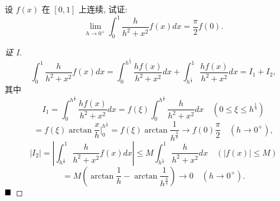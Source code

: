 \documentclass[lang=cn,newtx,10pt,scheme=chinese]{elegantbook}
\begin{document}
\begin{example}\label{eg:4.1.5}
设 $f(x)$ 在 $[0,1]$ 上连续, 试证:
$$\lim_{h \to 0^+} \int_{0}^{1} \frac{h}{h^2 + x^2} f(x) dx = \frac{\pi}{2} f(0).$$
\end{example}

\begin{proof}[证 I]
$$\int_{0}^{1} \frac{h}{h^2+x^2}f(x)dx = \int_{0}^{h^{\frac{1}{4}}} \frac{hf(x)}{h^2+x^2}dx + \int_{h^{\frac{1}{4}}}^{1} \frac{hf(x)}{h^2+x^2}dx = I_1 + I_2,$$
其中
$$I_1 = \int_{0}^{h^{\frac{1}{4}}} \frac{hf(x)}{h^2+x^2}dx = f(\xi) \int_{0}^{h^{\frac{1}{4}}} \frac{h}{h^2+x^2}dx \quad (0 \le \xi \le h^{\frac{1}{4}})$$
$$= f(\xi) \arctan \frac{x}{h} \Big|_{0}^{h^{\frac{1}{4}}} = f(\xi) \arctan \frac{1}{h^{\frac{3}{4}}} \to f(0) \frac{\pi}{2} \quad (h \to 0^+),$$
$$|I_2| = \left| \int_{h^{\frac{1}{4}}}^{1} \frac{h}{h^2+x^2}f(x)dx \right| \le M \int_{h^{\frac{1}{4}}}^{1} \frac{h}{h^2+x^2}dx \quad (|f(x)| \le M)$$
$$= M \left( \arctan \frac{1}{h} - \arctan \frac{1}{h^{\frac{3}{4}}} \right) \to 0 \quad (h \to 0^+).$$
$\hfill \blacksquare$
\end{proof}
\end{document}
